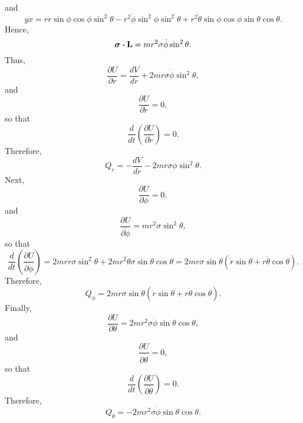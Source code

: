\begin{questions}
\begin{solution}
\begin{parts}
\[\]
and
\[
y \dot{x} = r \dot{r} \sin \phi \cos \phi \sin^2 \theta - r^2 \dot{\phi} \sin^2 \phi \sin^2 \theta + r^2 \dot{\theta} \sin \phi \cos \phi \sin \theta \cos \theta.
\]
Hence,
\[
\bm{\mathbf{\sigma}} \boldsymbol{\cdot} \bm{\mathbf{L}} = m r^2 \sigma \dot{\phi} \sin^2 \theta.
\]
Thus,
\[
\frac{\partial U}{\partial r} = \frac{dV}{dr} + 2 m r \sigma \dot{\phi} \sin^2 \theta,
\]
and
\[
\frac{\partial U}{\partial \dot{r}} = 0,
\]
so that
\[
\frac{d}{dt} \left( \frac{\partial U}{\partial \dot{r}} \right) = 0.
\]
Therefore,
\[
Q_r = -\frac{dV}{dr} - 2 m r \sigma \dot{\phi} \sin^2 \theta.
\]
Next,
\[
\frac{\partial U}{\partial \phi} = 0,
\]
and
\[
\frac{\partial U}{\partial \dot{\phi}} = m r^2 \sigma \sin^2 \theta,
\]
so that
\[
\frac{d}{dt} \left( \frac{\partial U}{\partial \dot{\phi}} \right) = 2 m r \dot{r} \sigma \sin^2 \theta + 2 m r^2 \dot{\theta} \sigma \sin \theta \cos \theta = 2 m r \sigma \sin \theta ( \dot{r} \sin \theta + r \dot{\theta} \cos \theta ).
\]
Therefore,
\[
Q_\phi = 2 m r \sigma \sin \theta ( \dot{r} \sin \theta + r \dot{\theta} \cos \theta ).
\]
Finally,
\[
\frac{\partial U}{\partial \theta} = 2 m r^2 \sigma \dot{\phi} \sin \theta \cos \theta,
\]
and
\[
\frac{\partial U}{\partial \dot{\theta}} = 0,
\]
so that
\[
\frac{d}{dt} \left( \frac{\partial U}{\partial \dot{\theta}} \right) = 0.
\]
Therefore,
\[
Q_\theta = -2 m r^2 \sigma \dot{\phi} \sin \theta \cos \theta.
\]


\end{parts}
\end{solution}
\end{questions}
